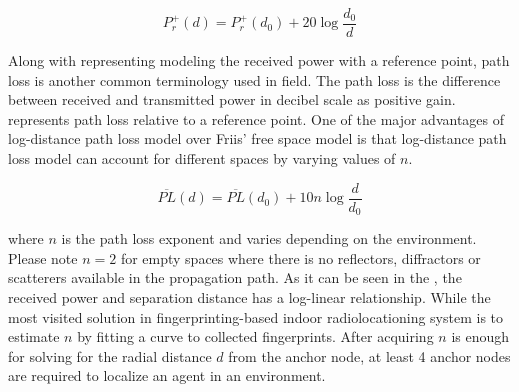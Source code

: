     \begin{equation}
        \label{eq:friisRef}
        P^{+}_r(d) = P^{+}_r(d_0) + 20 \log{\dfrac{d_0}{d}}
    \end{equation}

    Along with representing modeling the received power with a reference point, path loss is another common terminology used in field.
    The path loss is the difference between received and transmitted power in decibel scale as positive gain.
     represents path loss relative to a reference point.
    One of the major advantages of log-distance path loss model over Friis' free space model is that log-distance path loss model can account for different spaces by varying values of $n$.

    \begin{equation}
        \label{eq:log-distance}
        \overline{PL}(d) = \overline{PL}(d_0) + 10 n \log{\dfrac{d}{d_0}}
    \end{equation}

    \noindent where $n$ is the path loss exponent and varies depending on the environment.
    Please note $n = 2$ for empty spaces where there is no reflectors, diffractors or scatterers available in the propagation path.
    As it can be seen in the , the received power and separation distance has a log-linear relationship.
    While the most visited solution in fingerprinting-based indoor radiolocationing system is to estimate $n$ by fitting a curve to collected fingerprints.
    After acquiring $n$ is enough for solving for the radial distance $d$ from the anchor node, at least 4 anchor nodes are required to localize an agent in an environment.

